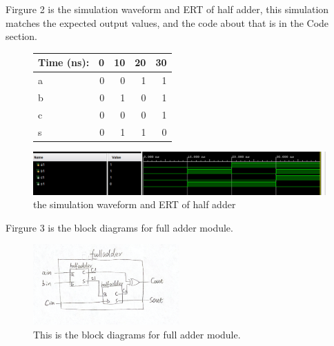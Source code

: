 \documentclass[11pt]{article}
\begin{document}
Firgure 2 is the simulation waveform and ERT of half adder, this simulation matches the expected output values, and the code about that is in the Code section. \\
\begin{figure}[ht]\centering
	\begin{tabular}{l|rrrr}
		Time (ns): & 0 & 10 & 20 & 30 \\
		\midrule
		a & 0 & 0 & 1 & 1 \\
		b & 0 & 1 & 0 & 1 \\
		\midrule
		c & 0 & 0 & 0 & 1 \\
		s & 0 & 1 & 1 & 0 \\
		\bottomrule
	\end{tabular}\medskip
		
	\includegraphics[width=1\textwidth]{HalfAdderSimulation}
	\caption{the simulation waveform and ERT of half adder}
	\label{fig:HalfAdderSimulation}
\end{figure}

Firgure 3 is the block diagrams for full adder module. \\
\begin{figure}[ht]\centering    
	\includegraphics[width=0.5\textwidth]{fulladder}    
	\caption{This is the block diagrams for full adder module.}    
	\label{fig:fulladder}
\end{figure}
\end{document}
